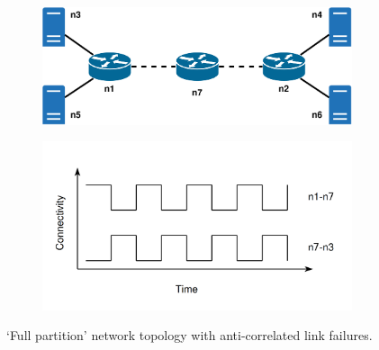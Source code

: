 \documentclass[withindex,glossary,openany]{cam-thesis}
\begin{document}
\begin{figure}[H]
\centering
\begin{subfigure}{.5\textwidth}
  \centering
  \includegraphics[width=1\linewidth]{delay_full_partition_topology}
  \caption{}
  \label{fig:full_partition_topology}
\end{subfigure}%
\begin{subfigure}{.5\textwidth}
  \centering
  \includegraphics[width=1\linewidth]{delay_full_partition_graph}
  \caption{}
  \label{fig:full_partition_graph}
\end{subfigure}
\caption{`Full partition' network topology with anti-correlated link failures.}
\label{fig:full_partition}
\end{figure}
\end{document}
